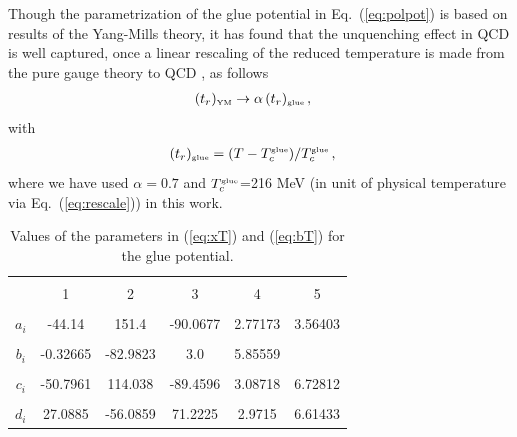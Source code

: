 \documentclass[%
reprint,
superscriptaddress,
showpacs,preprintnumbers,
amsmath,amssymb,
aps,
prd,
]{revtex4-1}
\def\Eq#1{Eq.~(\ref{#1})}
\def\eq#1{(\ref{#1})}
\begin{document}
	Though the parametrization of the glue potential in \Eq{eq:polpot} is based on results of the Yang-Mills theory, it has found that the unquenching effect in QCD is well captured, once a linear rescaling of the reduced temperature is made from the pure gauge theory to QCD \cite{Pawlowski:2010ht, Haas:2013qwp, Herbst:2013ufa}, as follows
	\begin{align}
		(t_r)_{\text{\tiny{YM}}}&\rightarrow \alpha\,(t_r)_{\text{\tiny{glue}}}\,,\label{}
	\end{align}
	with
	\begin{align}
		(t_r)_{\text{\tiny{glue}}}&=
		(T-T_c^\text{\tiny{glue}})/T_c^\text{\tiny{glue}}\,,\label{}
	\end{align}
	where we have used $\alpha=0.7$ and $T_c^\text{\tiny{glue}}$=216 MeV (in unit of physical temperature via \Eq{eq:rescale}) in this work.
	
	
	\begin{table}[tb!]
		\begin{center}
			\begin{tabular}{|c||c|c|c|c|c|}
				\hline & & & & &  \\[-2ex]
				\hline & & & & & \\[-1ex]
				& 1 & 2 & 3 & 4 & 5 \\[1ex]
				\hline & & & & &  \\[-2ex]
				$a_i$ &-44.14& 151.4 & -90.0677 &2.77173 &3.56403 \\[1ex]
				\hline & & & & &  \\[-2ex]
				$b_i$ &-0.32665 &-82.9823 &3.0 &5.85559  &              \\[1ex]
				\hline & & & & &  \\[-2ex]
				$c_i$ &-50.7961 &114.038 &-89.4596 &3.08718 &6.72812 \\[1ex]
				\hline & & & & &  \\[-2ex]
				$d_i$ & 27.0885 &-56.0859 &71.2225 &2.9715 &6.61433 \\[1ex]
				\hline
			\end{tabular}
			\caption{Values of the parameters in \eq{eq:xT} and \eq{eq:bT} for the glue potential.}
			\label{tab:gluepotCoeffs}
		\end{center}\vspace{-0.5cm}
	\end{table}
	
	
	
	
	
	
\end{document}
